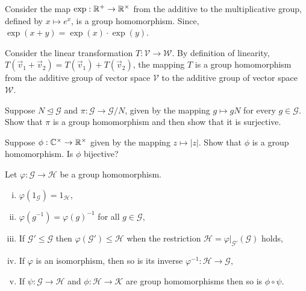 \begin{exmp}
	Consider the map $\exp : \mathbb{R}^{+} \to \mathbb{R}^{\times}$ from the additive to the
	multiplicative group, defined by $x \mapsto e^x$, is a group homomorphism.
	Since, $\exp{(x + y)} = \exp{(x)} \cdot \exp{(y)}$.
\end{exmp}

\begin{exmp}
	Consider the linear transformation $T : \mathcal{V} \to \mathcal{W}$.
	By definition of linearity, $T(\vec{v}_1 + \vec{v}_2) = T(\vec{v}_1) + T(\vec{v}_2)$,
	the mapping $T$ is a group homomorphism from the additive group of vector space $\mathcal{V}$
	to the additive group of vector space $\mathcal{W}$.
\end{exmp}

\begin{prob}
	Suppose $N \unlhd \mathcal{G}$ and $\pi : \mathcal{G} \to \mathcal{G} / N$,
	given by the mapping $g \mapsto g N$ for every $g \in \mathcal{G}$. Show that $\pi$
	is a group homomorphism and then show that it is surjective.
\end{prob}

\begin{prob}
	Suppose $\phi : \mathbb{C}^{\times} \to \mathbb{R}^{\times}$ given by the mapping $z \mapsto | z |$. Show
	that $\phi$ is a group homomorphism. Is $\phi$ bijective?
\end{prob}

\begin{prop}
	Let $\varphi : \mathcal{G} \to \mathcal{H}$ be a group homomorphism.
	\begin{enumerate}[i.)]
		\item $\varphi(1_{\mathcal{G}}) = 1_{\mathcal{H}}$,
		\item $\varphi(g^{-1}) = \varphi(g)^{-1}$ for all $g \in \mathcal{G}$,
		\item If $\mathcal{G}' \leq \mathcal{G}$ then $\varphi(\mathcal{G}') \leq \mathcal{H}$ when the restriction
			$\mathcal{H} = \varphi |_{\mathcal{G}'} (\mathcal{G})$ holds,
		\item If $\varphi$ is an isomorphism, then so is its inverse $\varphi^{-1} : \mathcal{H} \to \mathcal{G}$,
		\item If $\psi : \mathcal{G} \to \mathcal{H}$ and $\phi : \mathcal{H} \to \mathcal{K}$ are group
			homomorphisms then so is $\phi \circ \psi$.
	\end{enumerate}
\end{prop}

